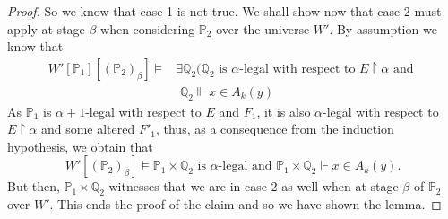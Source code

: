 \documentclass[a4paper,11pt]{article}
\newcommand{\forceP}{\mathbb{P}}
\newcommand{\forceQ}{\mathbb{Q}}
\begin{document}
\begin{proof}
So we know that case 1 is not true. We shall show now that case 2 must apply at stage $\beta$ when considering $\forceP_2$ over the universe $W'$. By assumption we know that
\begin{align*}
 W'[\forceP_1][(\forceP_2)_{\beta}] \models&\exists \forceQ_2 (\forceQ_2 \text{ is $\alpha$-legal with respect to $E \upharpoonright \alpha$ and } \\&  \, \, \forceQ_2 \Vdash x \in A_k(y)
\end{align*}
As $\forceP_1$ is $\alpha+1$-legal with respect to $E$ and $F_1$, it is also $\alpha$-legal with respect to $E \upharpoonright \alpha$ and some altered $F'_1$, thus, as a consequence from the induction hypothesis, we obtain that 
\[W'[(\forceP_2)_{\beta}] \models \forceP_1 \times \forceQ_2 \text{ is $\alpha$-legal and } \forceP_1 \times \forceQ_2 \Vdash x \in A_k(y).\] 
But then, $\forceP_1 \times \forceQ_2$ witnesses that we are in case 2 as well when at stage $\beta$ of $\forceP_2$ over $W'$.
This ends the proof of the claim and so we have shown the lemma.
\end{proof}
\end{document}
